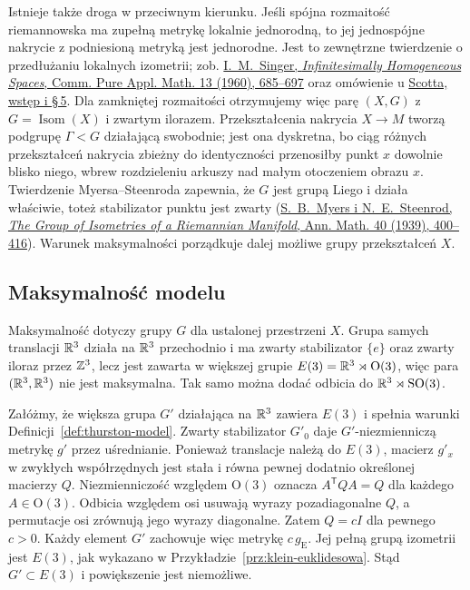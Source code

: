 Istnieje także droga w przeciwnym kierunku. Jeśli spójna
rozmaitość riemannowska ma zupełną metrykę lokalnie jednorodną,
to jej jednospójne nakrycie z podniesioną metryką jest jednorodne.
Jest to zewnętrzne twierdzenie o przedłużaniu lokalnych izometrii;
zob. \href{https://doi.org/10.1002/cpa.3160130408}
{I.\ M.\ Singer, \emph{Infinitesimally Homogeneous Spaces},
Comm. Pure Appl. Math. 13 (1960), 685--697} oraz omówienie
u \href{https://sschleimer.warwick.ac.uk/Teach/2021_3MFDS/References/1983the_geometries_of_three-manifolds.pdf}
{Scotta, wstęp i \S\,5}. Dla zamkniętej rozmaitości otrzymujemy
więc parę $(X,G)$ z $G=\operatorname{Isom}(X)$ i zwartym ilorazem.
Przekształcenia nakrycia $X\to M$ tworzą podgrupę
$\Gamma<G$ działającą swobodnie; jest ona dyskretna,
bo ciąg różnych przekształceń nakrycia zbieżny do identyczności
przenosiłby punkt $x$ dowolnie blisko niego, wbrew rozdzieleniu
arkuszy nad małym otoczeniem obrazu $x$.
Twierdzenie Myersa--Steenroda zapewnia, że $G$ jest grupą Liego
i działa właściwie, toteż stabilizator punktu jest zwarty
(\href{https://doi.org/10.2307/1968928}
{S.\ B.\ Myers i N.\ E.\ Steenrod,
\emph{The Group of Isometries of a Riemannian Manifold},
Ann. Math. 40 (1939), 400--416}). Warunek maksymalności
porządkuje dalej możliwe grupy przekształceń $X$.

\subsection*{Maksymalność modelu}

Maksymalność dotyczy grupy $G$ dla ustalonej przestrzeni $X$.
Grupa samych translacji $\mathbb{R}^3$ działa na $\mathbb{R}^3$ przechodnio
i ma zwarty stabilizator $\{e\}$ oraz zwarty iloraz przez $\mathbb{Z}^3$,
lecz jest zawarta w większej grupie
$E(3)=\mathbb{R}^3\rtimes\mathrm O(3)$, więc para $(\mathbb{R}^3,\mathbb{R}^3)$
nie jest maksymalna. Tak samo można dodać odbicia do
$\mathbb{R}^3\rtimes\mathrm{SO}(3)$.

\begin{przyklad}
\label{prz:thurston-euklidesowa-maksymalna}
Załóżmy, że większa grupa $G'$ działająca na $\mathbb{R}^3$ zawiera
$E(3)$ i spełnia warunki Definicji~\ref{def:thurston-model}.
Zwarty stabilizator $G'_0$ daje $G'$-niezmienniczą metrykę
$g'$ przez uśrednianie. Ponieważ translacje należą do $E(3)$,
macierz $g'_x$ w zwykłych współrzędnych jest stała i równa
pewnej dodatnio określonej macierzy $Q$. Niezmienniczość
względem $\mathrm O(3)$ oznacza $A^{\mathsf T}QA=Q$ dla
każdego $A\in\mathrm O(3)$. Odbicia względem osi usuwają
wyrazy pozadiagonalne $Q$, a permutacje osi zrównują jego
wyrazy diagonalne. Zatem $Q=cI$ dla pewnego $c>0$.
Każdy element $G'$ zachowuje więc metrykę $c\,g_{\mathrm E}$.
Jej pełną grupą izometrii jest $E(3)$, jak wykazano w
Przykładzie~\ref{prz:klein-euklidesowa}. Stąd
$G'\subset E(3)$ i powiększenie jest niemożliwe.
\end{przyklad}

